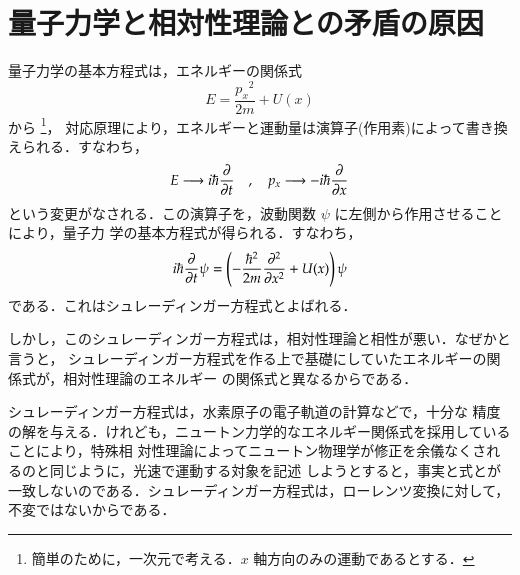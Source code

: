 ﻿%
    \section{量子力学と相対性理論との矛盾の原因}
        量子力学の基本方程式は，エネルギーの関係式
            \begin{equation*}
                E = \frac{{p_{x}}^{2}}{2m} + U(x)
            \end{equation*}
        から
            \footnote{
                簡単のために，一次元で考える．$x$ 軸方向のみの運動であるとする．
            }，
        対応原理により，エネルギーと運動量は演算子(作用素)によって書き換えられる．すなわち，
            \begin{equation*}
                E     \longrightarrow  i \hbar \frac{\partial}{\partial t}
                \quad,\quad
                p_{x} \longrightarrow -i \hbar \frac{\partial}{\partial x}
            \end{equation*}
        という変更がなされる．この演算子を，波動関数 $\psi$ に左側から作用させることにより，量子力
        学の基本方程式が得られる．すなわち，
            \begin{align}
                i \hbar \frac{\partial}{\partial t} \psi  =
                    \left( -\frac{\hbar^{2}}{2m} \frac{\partial^{2}}{\partial x^{2}} + U(x) \right) \psi
            \end{align}
        である．これはシュレーディンガー方程式とよばれる．

        しかし，このシュレーディンガー方程式は，相対性理論と相性が悪い．なぜかと言うと，
        シュレーディンガー方程式を作る上で基礎にしていたエネルギーの関係式が，相対性理論のエネルギー
        の関係式と異なるからである．

        シュレーディンガー方程式は，水素原子の電子軌道の計算などで，十分な
        精度の解を与える．けれども，ニュートン力学的なエネルギー関係式を採用していることにより，特殊相
        対性理論によってニュートン物理学が修正を余儀なくされるのと同じように，光速で運動する対象を記述
        しようとすると，事実と式とが一致しないのである．シュレーディンガー方程式は，ローレンツ変換に対して，不変ではないからである．

